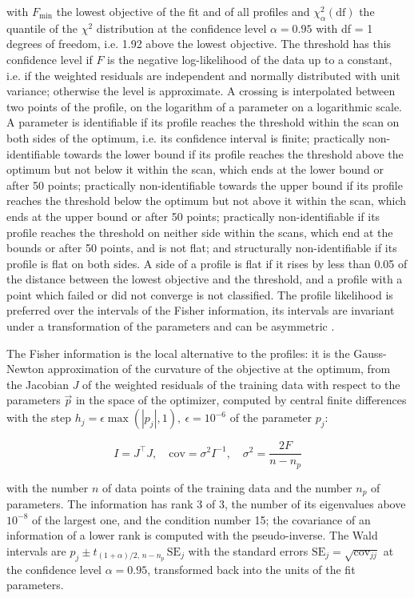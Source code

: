 with $F_{\min}$ the lowest objective of the fit and of all profiles and $\chi^2_{\alpha}(\mathrm{df})$ the quantile of the $\chi^2$ distribution at the confidence level $\alpha = 0.95$ with df = 1 degrees of freedom, i.e. 1.92 above the lowest objective. The threshold has this confidence level if $F$ is the negative log-likelihood of the data up to a constant, i.e. if the weighted residuals are independent and normally distributed with unit variance; otherwise the level is approximate. A crossing is interpolated between two points of the profile, on the logarithm of a parameter on a logarithmic scale. A parameter is identifiable if its profile reaches the threshold within the scan on both sides of the optimum, i.e. its confidence interval is finite; practically non-identifiable towards the lower bound if its profile reaches the threshold above the optimum but not below it within the scan, which ends at the lower bound or after 50 points; practically non-identifiable towards the upper bound if its profile reaches the threshold below the optimum but not above it within the scan, which ends at the upper bound or after 50 points; practically non-identifiable if its profile reaches the threshold on neither side within the scans, which end at the bounds or after 50 points, and is not flat; and structurally non-identifiable if its profile is flat on both sides. A side of a profile is flat if it rises by less than 0.05 of the distance between the lowest objective and the threshold, and a profile with a point which failed or did not converge is not classified. The profile likelihood is preferred over the intervals of the Fisher information, its intervals are invariant under a transformation of the parameters and can be asymmetric \cite{Wieland2021}.

The Fisher information is the local alternative to the profiles: it is the Gauss-Newton approximation of the curvature of the objective at the optimum, from the Jacobian $J$ of the weighted residuals of the training data with respect to the parameters $\vec{p}$ in the space of the optimizer, computed by central finite differences with the step $h_j = \epsilon \max(|p_j|, 1),\ \epsilon = 10^{-6}$ of the parameter $p_j$:

\begin{equation}
I = J^\top J, \quad \mathrm{cov} = \sigma^2 I^{-1}, \quad \sigma^2 = \frac{2 F}{n - n_p}
\end{equation}

with the number $n$ of data points of the training data and the number $n_p$ of parameters. The information has rank 3 of 3, the number of its eigenvalues above $10^{-8}$ of the largest one, and the condition number 15; the covariance of an information of a lower rank is computed with the pseudo-inverse. The Wald intervals are $\hat{p}_j \pm t_{(1+\alpha)/2,\, n-n_p}\, \mathrm{SE}_j$ with the standard errors $\mathrm{SE}_j = \sqrt{\mathrm{cov}_{jj}}$ at the confidence level $\alpha = 0.95$, transformed back into the units of the fit parameters.

